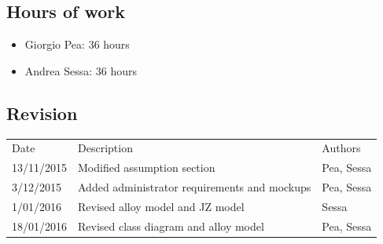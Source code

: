 \documentclass[11pt,titlepage]{article} %
\begin{document}
	\subsection{Hours of work}
		\begin{itemize}
			\item Giorgio Pea: 36 hours
			\item Andrea Sessa: 36 hours
		\end{itemize}
	\subsection{Revision}
		\begin{table}[h]
		\centering
		\begin{tabular}{lll}
		Date       & Description & Authors    \\
		13/11/2015 & Modified assumption section& Pea, Sessa \\
		3/12/2015 & Added administrator requirements and mockups & Pea, Sessa \\
		1/01/2016 & Revised alloy model and JZ model & Sessa \\
		18/01/2016 & Revised class diagram and alloy model & Pea, Sessa
		\end{tabular}
		\end{table}
\end{document}
